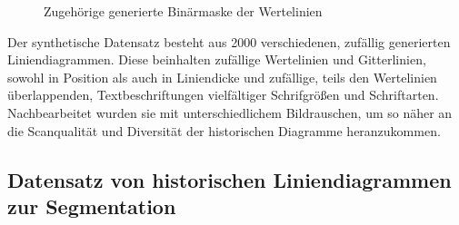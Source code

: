 \begin{figure}[H]
\begin{minipage}{0.475\textwidth}
        \caption{ Zugehörige generierte Binärmaske der Wertelinien}
        \label{fig:lines_synthetic_mask}
    \end{minipage}
\end{figure}

Der synthetische Datensatz besteht aus 2000 verschiedenen, zufällig generierten Liniendiagrammen. Diese beinhalten zufällige Wertelinien und Gitterlinien, sowohl in Position als auch in Liniendicke und zufällige, teils den Wertelinien überlappenden, Textbeschriftungen vielfältiger Schrifgrößen und Schriftarten. Nachbearbeitet wurden sie mit unterschiedlichem Bildrauschen, um so näher an die Scanqualität und Diversität der historischen Diagramme heranzukommen.

\subsection{Datensatz von historischen Liniendiagrammen zur Segmentation}

